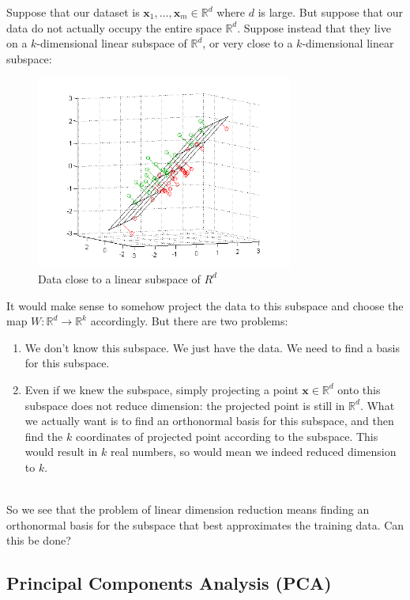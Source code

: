 \documentclass[11pt]{article}
\newcommand{\R}{\ensuremath{\mathbb{R}}}
\newcommand{\V}[1]{\mathbf{#1}}
\begin{document}
Suppose that our dataset is 
$\V{x}_1,\ldots,\V{x}_m\in\R^d$ where $d$ is large. But suppose that our
data do not actually occupy the entire
space $\R^d$. Suppose instead that they live on a $k$-dimensional linear 
subspace of $\R^d$, or very close to a  $k$-dimensional linear 
subspace:

\begin{figure}[H]
  \centering
  \includegraphics[height=2.5in]{subspace.png}    
  \caption{Data close to a linear subspace of $R^d$}
\end{figure}

It would make sense to somehow project the data to this subspace and choose the
map $W:\R^d\to\R^k$ accordingly. 
But there are two
problems: 
\begin{enumerate}
  \item We don't know this subspace. We just have the data. We need to find a
    basis for this subspace.
  \item Even if we knew the subspace, 
    simply projecting a point $\V{x}\in\R^d$ onto this subspace does not 
    reduce dimension: the projected point is still in $\R^d$. What we actually
    want is to find an orthonormal basis for this subspace, and then find
    the $k$ coordinates of 
    projected point according to the subspace. This would result in $k$ 
    real numbers, so would mean we indeed reduced dimension to $k$. 
 
\end{enumerate}
~\\
So we see that the problem of linear dimension reduction means finding an
orthonormal basis for the subspace that best approximates the training data. Can
this be done?

\subsection{Principal Components Analysis (PCA)}
\end{document}
